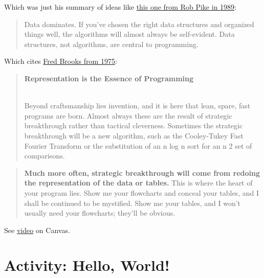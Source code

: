 \documentclass[
  letterpaper,
  DIV=11,
  numbers=noendperiod]{scrreprt}
\begin{document}
Which was just his summary of ideas like
\href{http://doc.cat-v.org/bell_labs/pikestyle}{this one from Rob Pike
in 1989}:

\begin{quote}
Data dominates. If you've chosen the right data structures and organized
things well, the algorithms will almost always be self-evident. Data
structures, not algorithms, are central to programming.
\end{quote}

Which cites
\href{https://archive.org/stream/mythicalmanmonth00fred/mythicalmanmonth00fred_djvu.txt}{Fred
Brooks from 1975}:

\begin{quote}
\textbf{Representation is the Essence of Programming}\\
\strut \\
Beyond craftsmanship lies invention, and it is here that lean, spare,
fast programs are born. Almost always these are the result of strategic
breakthrough rather than tactical cleverness. Sometimes the strategic
breakthrough will be a new algorithm, such as the Cooley-Tukey Fast
Fourier Transform or the substitution of an n log n sort for an n 2 set
of comparisons.
\end{quote}

\begin{quote}
\textbf{Much more often, strategic breakthrough will come from redoing
the representation of the data or tables.} This is where the heart of
your program lies. Show me your flowcharts and conceal your tables, and
I shall be continued to be mystified. Show me your tables, and I won't
usually need your flowcharts; they'll be obvious.
\end{quote}

\begin{tcolorbox}[enhanced jigsaw, toprule=.15mm, opacityback=0, opacitybacktitle=0.6, colback=white, breakable, title=\textcolor{quarto-callout-note-color}{\faInfo}\hspace{0.5em}{Note}, toptitle=1mm, left=2mm, titlerule=0mm, bottomtitle=1mm, rightrule=.15mm, coltitle=black, colbacktitle=quarto-callout-note-color!10!white, colframe=quarto-callout-note-color-frame, arc=.35mm, bottomrule=.15mm, leftrule=.75mm]

See
\href{https://canvas.its.virginia.edu/courses/75059/modules/items/821906}{video}
on Canvas.

\end{tcolorbox}

\hypertarget{activity-hello-world}{%
\chapter{Activity: Hello, World!}\label{activity-hello-world}}
\end{document}
